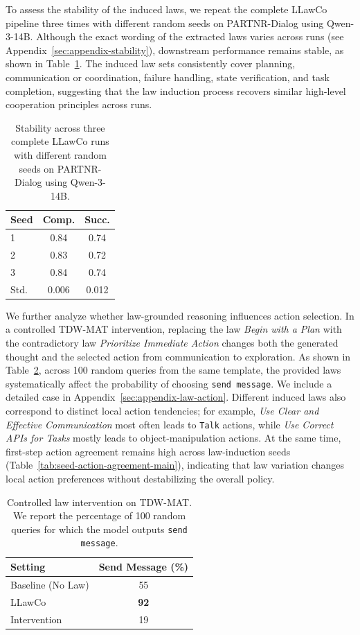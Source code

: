 \documentclass{article}
\theoremstyle{plain}
\theoremstyle{definition}
\theoremstyle{remark}
\newcommand{\name}{LLawCo\xspace}
\begin{document}
To assess the stability of the induced laws, we repeat the complete \name pipeline three times with different random seeds on PARTNR-Dialog using Qwen-3-14B. Although the exact wording of the extracted laws varies across runs (see Appendix~\ref{sec:appendix-stability}), downstream performance remains stable, as shown in Table~\ref{tab:seed-stability-main}. The induced law sets consistently cover planning, communication or coordination, failure handling, state verification, and task completion, suggesting that the law induction process recovers similar high-level cooperation principles across runs.

\begin{table}[t]
\centering
\setlength{\tabcolsep}{6pt}
\caption{Stability across three complete \name runs with different random seeds on PARTNR-Dialog using Qwen-3-14B.}
\label{tab:seed-stability-main}
\begin{tabular}{l|cc}
\toprule
\textbf{Seed} & \textbf{Comp.} & \textbf{Succ.} \\
\midrule
1 & 0.84 & 0.74 \\
2 & 0.83 & 0.72 \\
3 & 0.84 & 0.74 \\
\midrule
Std. & 0.006 & 0.012 \\
\bottomrule
\end{tabular}
\end{table}

We further analyze whether law-grounded reasoning influences action selection. In a controlled TDW-MAT intervention, replacing the law \textit{Begin with a Plan} with the contradictory law \textit{Prioritize Immediate Action} changes both the generated thought and the selected action from communication to exploration. As shown in Table~\ref{tab:send-message-main}, across 100 random queries from the same template, the provided laws systematically affect the probability of choosing \texttt{send message}. We include a detailed case in Appendix~\ref{sec:appendix-law-action}. Different induced laws also correspond to distinct local action tendencies; for example, \textit{Use Clear and Effective Communication} most often leads to \texttt{Talk} actions, while \textit{Use Correct APIs for Tasks} mostly leads to object-manipulation actions. At the same time, first-step action agreement remains high across law-induction seeds (Table~\ref{tab:seed-action-agreement-main}), indicating that law variation changes local action preferences without destabilizing the overall policy.

\begin{table}[t]
\centering
\setlength{\tabcolsep}{6pt}
\caption{Controlled law intervention on TDW-MAT. We report the percentage of 100 random queries for which the model outputs \texttt{send message}.}
\label{tab:send-message-main}
\begin{tabular}{l|c}
\toprule
\textbf{Setting} & \textbf{Send Message (\%)} \\
\midrule
Baseline (No Law) & 55 \\
\name & \textbf{92} \\
Intervention & 19 \\
\bottomrule
\end{tabular}
\end{table}
\end{document}
